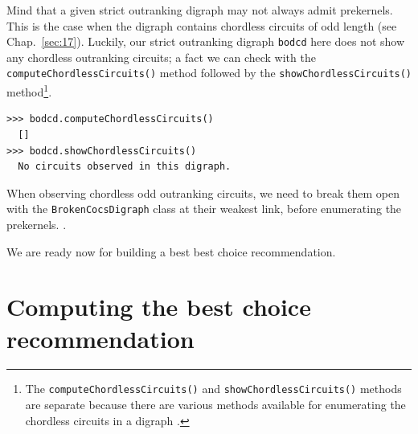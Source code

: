 Mind that a given strict outranking digraph may not always admit prekernels. This is the case when the digraph contains chordless circuits of odd length (see Chap.~\ref{sec:17}). Luckily, our strict outranking digraph \texttt{bodcd} here does not show any chordless outranking circuits; a fact we can check with the \texttt{computeChordless\-Cir\-cuits()} method followed by the \texttt{showChordlessCircuits()} method\footnote{The \texttt{computeChordlessCircuits()} and \texttt{showChordlessCircuits()} methods are separate because there are various methods available for enumerating the chordless circuits in a digraph \citep{BIS-2010}.}.
\begin{lstlisting}
>>> bodcd.computeChordlessCircuits()
  []  
>>> bodcd.showChordlessCircuits()
  No circuits observed in this digraph.
\end{lstlisting}

When observing chordless odd outranking circuits, we need to break them open with the \texttt{BrokenCocsDigraph} class at their weakest link, before enumerating the prekernels. \citep{BIS-2021b}.

We are ready now for building a best best choice recommendation.

\section{Computing the \Rubis best choice recommendation}
\label{sec:4.5}

